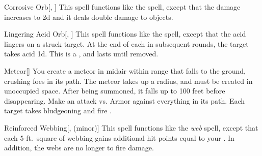 \lowercase{\hypertarget{spell:Corrosive Orb}{}}\label{spell:Corrosive Orb}
\begin{freeability}[\nth{3}]{\hypertarget{spell:Corrosive Orb}{Corrosive Orb}}[, ]
This spell functions like the  spell, except that the damage increases to  \plus2d and it deals double damage to objects.
\end{freeability}
\vspace{0.25em}



\lowercase{\hypertarget{spell:Lingering Acid Orb}{}}\label{spell:Lingering Acid Orb}
\begin{freeability}[\nth{3}]{\hypertarget{spell:Lingering Acid Orb}{Lingering Acid Orb}}[, ]
This spell functions like the  spell, except that the acid lingers on a struck target.
At the end of each  in subsequent rounds, the target takes acid  \minus1d.
This is a , and lasts until removed.
\end{freeability}
\vspace{0.25em}



\lowercase{\hypertarget{spell:Meteor}{}}\label{spell:Meteor}
\begin{freeability}[\nth{3}]{\hypertarget{spell:Meteor}{Meteor}}[]
You create a meteor in midair within \rngmed range that falls to the ground, crushing foes in its path.
The meteor takes up a \areasmall radius, and must be created in unoccupied space.
After being summoned, it falls up to 100 feet before disappearing.
Make an attack vs. Armor against everything in its path.
\hit Each target takes bludgeoning and fire .
\end{freeability}
\vspace{0.25em}



\lowercase{\hypertarget{spell:Reinforced Webbing}{}}\label{spell:Reinforced Webbing}
\begin{freeability}[\nth{3}]{\hypertarget{spell:Reinforced Webbing}{Reinforced Webbing}}[,  (minor)]
This spell functions like the \textit{web} spell, except that each 5-ft.\ square of webbing gains additional hit points equal to your .
In addition, the webs are no longer  to fire damage.
\end{freeability}
\vspace{0.25em}



